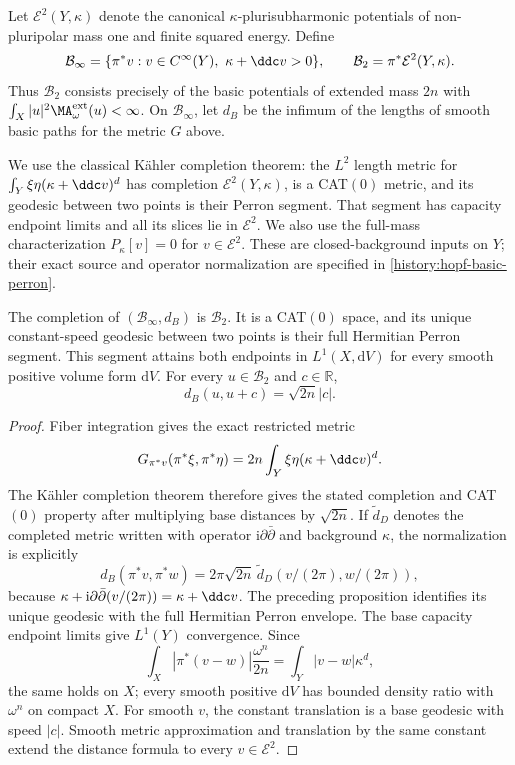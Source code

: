 Let $\mathcal E^2(Y,\kappa)$ denote the canonical $\kappa$-plurisubharmonic potentials of non-pluripolar mass one and finite squared energy. Define
\[
 \mathcal B_\infty=\{\pi^*v:v\in C^\infty(Y),\ \kappa+\ddc v>0\},
 \qquad
 \mathcal B_2=\pi^*\mathcal E^2(Y,\kappa).
\]
Thus $\mathcal B_2$ consists precisely of the basic potentials of extended mass $2n$ with $\int_X|u|^2\MA^{\mathrm{ext}}_\omega(u)<\infty$. On $\mathcal B_\infty$, let $d_B$ be the infimum of the lengths of smooth basic paths for the metric $G$ above.

We use the classical K\"ahler completion theorem: the $L^2$ length metric for $\int_Y\xi\eta(\kappa+\ddc v)^d$ has completion $\mathcal E^2(Y,\kappa)$, is a CAT$(0)$ metric, and its geodesic between two points is their Perron segment. That segment has capacity endpoint limits and all its slices lie in $\mathcal E^2$. We also use the full-mass characterization $P_\kappa[v]=0$ for $v\in\mathcal E^2$. These are closed-background inputs on $Y$; their exact source and operator normalization are specified in \cref{history:hopf-basic-perron}.

\begin{theorem}\label{thm:hopf-basic-completion}
The completion of $(\mathcal B_\infty,d_B)$ is $\mathcal B_2$. It is a CAT$(0)$ space, and its unique constant-speed geodesic between two points is their full Hermitian Perron segment. This segment attains both endpoints in $L^1(X,\mathrm dV)$ for every smooth positive volume form $\mathrm dV$. For every $u\in\mathcal B_2$ and $c\in\mathbb R$,
\[
 d_B(u,u+c)=\sqrt{2n}|c|.
\]
\end{theorem}
\begin{proof}
Fiber integration gives the exact restricted metric
\begin{equation}\label{eq:hopf-basic-metric}
 G_{\pi^*v}(\pi^*\xi,\pi^*\eta)
 =2n\int_Y\xi\eta(\kappa+\ddc v)^d.
\end{equation}
The K\"ahler completion theorem therefore gives the stated completion and CAT$(0)$ property after multiplying base distances by $\sqrt{2n}$. If $\widetilde d_D$ denotes the completed metric written with operator $\mathrm i\partial\bar\partial$ and background $\kappa$, the normalization is explicitly
\begin{equation}\label{eq:hopf-basic-distance}
 d_B(\pi^*v,\pi^*w)
 =2\pi\sqrt{2n}\,\widetilde d_D(v/(2\pi),w/(2\pi)),
\end{equation}
because $\kappa+\mathrm i\partial\bar\partial(v/(2\pi))=\kappa+\ddc v$.
The preceding proposition identifies its unique geodesic with the full Hermitian Perron envelope. The base capacity endpoint limits give $L^1(Y)$ convergence. Since
\[
 \int_X|\pi^*(v-w)|\frac{\omega^n}{2n}
 =\int_Y|v-w|\kappa^d,
\]
the same holds on $X$; every smooth positive $\mathrm dV$ has bounded density ratio with $\omega^n$ on compact $X$. For smooth $v$, the constant translation is a base geodesic with speed $|c|$. Smooth metric approximation and translation by the same constant extend the distance formula to every $v\in\mathcal E^2$.
\end{proof}

